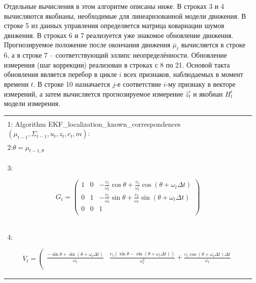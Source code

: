 \documentclass[10pt,a4paper]{article}
\begin{document}
Отдельные вычисления в этом алгоритме описаны ниже.
В строках 3 и 4 вычисляются якобианы, необходимые для линеаризованной модели движения.
В строке 5 из данных управления определяется матрица ковариации шумов движения. В строках 6 и 7 реализуется уже знакомое обновление движения. Прогнозируемое положение после окончания движения $\bar{\mu}_t$ вычисляется в строке 6, а в строке 7 – соответствующий эллипс неопределённости. Обновление измерения (шаг коррекции) реализован в строках с 8 по 21. Основой такта обновления является перебор в цикле $i$ всех признаков, наблюдаемых в момент времени $t$. В строке 10 назначается $j$-е соответствие $i$-му признаку в векторе измерений, а затем вычисляется прогнозируемое измерение $\hat{z}_t^i$ и якобиан $H_t^i$ модели измерения.

\begin{table}[H]
\begin{center}
\begin{tabular}{|l|}
\hline
{}\\
1: Algorithm EKF\_localization\_known\_correspondences$(\mu_{t-1},\varSigma_{t-1},u_t,z_t,c_t,m):$ \\
2:\hspace{5mm}$\theta=\mu_{t-1,\theta}$\\
3:\hspace{5mm}
\begin{minipage}{0.2\textwidth}
\begin{equation*}
G_t=
\left(\begin{array}{ccc}
1&0&-\frac{\upsilon_t}{\omega_t}\cos\theta+\frac{\upsilon_t}{\omega_t}\cos(\theta+\omega_t\varDelta t)\\
0&1&-\frac{\upsilon_t}{\omega_t}\sin\theta+\frac{\upsilon_t}{\omega_t}\sin(\theta+\omega_t\varDelta t)\\
0&0&1\\
\end{array}\right)
\end{equation*}
\end{minipage}\\
4:\hspace{5mm}
\begin{minipage}{0.2\textwidth}
\begin{equation*}
V_t=
\left(\begin{array}{cc}
\frac{-\sin\theta+\sin(\theta+\omega_t\varDelta t)}{\omega_t}&\frac{\upsilon_t(\sin\theta-\sin(\theta+\omega_t\varDelta t))}{\omega_t^2}+\frac{\upsilon_t\cos(\theta+\omega_t\varDelta t)\varDelta t}{\omega_t}\\

\end{array}
\end{equation*}
\end{minipage}
\end{tabular}
\end{center}
\end{table}
\end{document}

